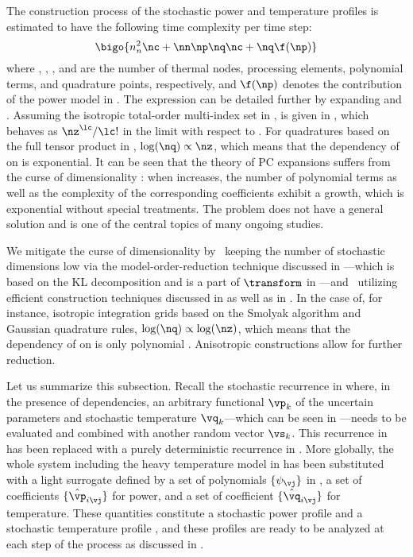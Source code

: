 The construction process of the stochastic power and temperature profiles is
estimated to have the following time complexity per time step:
\[
  \bigo{n_n^2 \nc + \nn \np \nq \nc + \nq \f(\np)}
\]
where \nn, \np, \nc, and \nq are the number of thermal nodes, processing
elements, polynomial terms, and quadrature points, respectively, and $\f(\np)$
denotes the contribution of the power model in . The
expression can be detailed further by expanding \nc and \nq. Assuming the
isotropic total-order multi-index set in , \nc
is given in , which behaves as $\nz^\lc
/ \lc!$ in the limit with respect to \nz. For quadratures based on the full
tensor product in , $\log(\nq) \propto \nz$, which
means that the dependency of \nq on \nz is exponential. It can be seen that the
theory of \ac{PC} expansions suffers from the curse of dimensionality
\cite{eldred2008, xiu2010}: when \nz increases, the number of polynomial terms
as well as the complexity of the corresponding coefficients exhibit a growth,
which is exponential without special treatments. The problem does not have a
general solution and is one of the central topics of many ongoing studies.

We mitigate the curse of dimensionality by \one~keeping the number of stochastic
dimensions low via the model-order-reduction technique discussed in
---which is based on the \ac{KL} decomposition
and is a part of $\transform$ in ---and
\two~utilizing efficient construction techniques discussed in
 as well as in .
In the case of, for instance, isotropic integration grids based on the Smolyak
algorithm and Gaussian quadrature rules, $\log(\nq) \propto \log(\nz)$, which
means that the dependency of \nq on \nz is only polynomial \cite{heiss2008}.
Anisotropic constructions allow for further reduction.

Let us summarize this subsection. Recall the stochastic recurrence in
 where, in the presence of dependencies, an
arbitrary functional $\vp_k$ of the uncertain parameters \vu and stochastic
temperature $\vq_k$---which can be seen in ---needs to
be evaluated and combined with another random vector $\vs_k$. This recurrence in
 has been replaced with a purely deterministic
recurrence in . More globally, the whole system including
the heavy temperature model in  has been
substituted with a light surrogate defined by a set of polynomials $\{
\psi_{\vj} \}$ in \vz, a set of coefficients $\{ \hat{\vp}_{i \vj} \}$ for
power, and a set of coefficient $\{ \hat{\vq}_{i \vj} \}$ for temperature. These
quantities constitute a stochastic power profile \mp and a stochastic
temperature profile \mq, and these profiles are ready to be analyzed at each
step of the process as discussed in .


